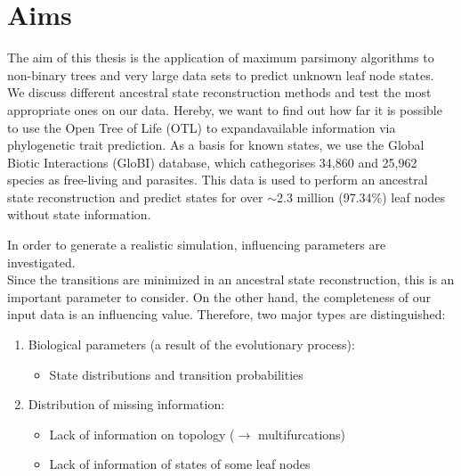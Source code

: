 \chapter{Aims}
  The aim of this thesis is the application of maximum parsimony algorithms to non-binary trees and 
    very large data sets to predict unknown leaf node states. \\
  We discuss different ancestral state reconstruction methods and test the most appropriate ones on 
    our data. Hereby, we want to find out how far it is possible to use the Open Tree of Life (OTL) 
    to expandavailable information via phylogenetic trait prediction. As a basis for known states, 
    we use the Global Biotic Interactions (GloBI) database, which cathegorises 34,860 and 25,962 
    species as free-living and parasites. This data is used to perform an ancestral state 
    reconstruction and predict states for over $\sim$2.3 million (97.34\%) leaf nodes without state 
    information.

  In order to generate a realistic simulation, influencing parameters are investigated. \\
  Since the transitions are minimized in an ancestral state reconstruction, this is an important 
    parameter to consider. On the other hand, the completeness of our input data is an influencing 
    value. Therefore, two major types are distinguished:
  \begin{enumerate}
    \item Biological parameters (a result of the evolutionary process):
      \begin{itemize}
        \item State distributions and transition probabilities
      \end{itemize}
    \item Distribution of missing information:
      \begin{itemize}
        \item Lack of information on topology ($\rightarrow$ multifurcations)
        \item Lack of information of states of some leaf nodes
      \end{itemize}
  \end{enumerate}

